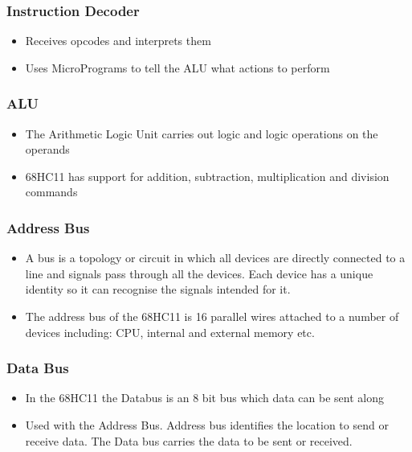		\subsubsection{Instruction Decoder}
			\begin{itemize}
				\item Receives opcodes and interprets them
				\item Uses MicroPrograms to tell the ALU what actions to perform
			\end{itemize}
		
		\subsubsection{ALU}
			\begin{itemize}
				\item The Arithmetic Logic Unit carries out logic and logic operations on the operands
				\item 68HC11 has support for addition, subtraction, multiplication and division commands
			\end{itemize}
		
		\subsubsection{Address Bus}
			\begin{itemize}
				\item A bus is a topology or circuit in which all devices are directly connected to a line
and signals pass through all the devices. Each device has a unique identity so it can recognise the signals intended for it.
				\item The address bus of the 68HC11 is 16 parallel wires attached to a number of devices including:
CPU, internal and external memory etc.
			\end{itemize}
		
		\subsubsection{Data Bus}
			\begin{itemize}
				\item In the 68HC11 the Databus is an 8 bit bus which data can be sent along
				\item Used with the Address Bus. Address bus identifies the location to send or receive data.
The Data bus carries the data to be sent or received.
			\end{itemize}
		
